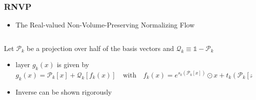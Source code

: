 \begin{frame}
    \frametitle{RNVP}
    \begin{itemize}
        \setlength\itemsep{.6em}
        \item The Real-valued Non-Volume-Preserving Normalizing Flow
    \end{itemize}
    \begin{columns}
        \begin{column}[t]{0.48\textwidth}
            \item Let $\mathcal{P}_k$ be a projection over half of the basis vectors and $\mathcal{Q}_k \equiv \mathbb{1} - \mathcal{P}_k$
            \begin{itemize}
                \item layer $g_k(x)$ is given by 
                \begin{equation}
                    g_k(x) = \mathcal{P}_k[x] + \mathcal{Q}_k [f_k(x)] \quad \text{with} \quad f_k(x) =  e^{s_k(\mathcal{P}_k[x])} \odot x + t_k(\mathcal{P}_k[x])
                    \label{eq:layer_RNVP}
                \end{equation}
                \setlength\itemsep{.6em}
                \item Inverse can be shown rigorously
            \end{itemize}
        \end{column}


\end{columns}
\end{frame}
